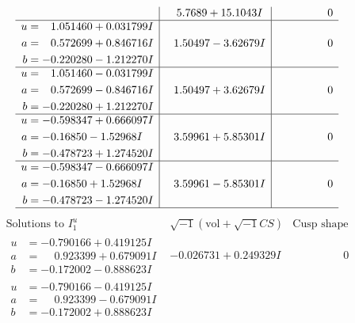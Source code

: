 \documentclass[1p]{elsarticle_modified}
\theoremstyle{definition}
\newcommand{\I}{\sqrt{-1}}
\begin{document}
$$\begin{array}{c|c|c}
 & \phantom{-}5.7689 + 15.1043 I & \phantom{-0.000000 } 0 \\ \hline\begin{aligned}
u &= \phantom{-}1.051460 + 0.031799 I \\
a &= \phantom{-}0.572699 + 0.846716 I \\
b &= -0.220280 - 1.212270 I\end{aligned}
 & \phantom{-}1.50497 - 3.62679 I & \phantom{-0.000000 } 0 \\ \hline\begin{aligned}
u &= \phantom{-}1.051460 - 0.031799 I \\
a &= \phantom{-}0.572699 - 0.846716 I \\
b &= -0.220280 + 1.212270 I\end{aligned}
 & \phantom{-}1.50497 + 3.62679 I & \phantom{-0.000000 } 0 \\ \hline\begin{aligned}
u &= -0.598347 + 0.666097 I \\
a &= -0.16850 - 1.52968 I \\
b &= -0.478723 + 1.274520 I\end{aligned}
 & \phantom{-}3.59961 + 5.85301 I & \phantom{-0.000000 } 0 \\ \hline\begin{aligned}
u &= -0.598347 - 0.666097 I \\
a &= -0.16850 + 1.52968 I \\
b &= -0.478723 - 1.274520 I\end{aligned}
 & \phantom{-}3.59961 - 5.85301 I & \phantom{-0.000000 } 0\\
 \hline 
 \end{array}$$\newpage$$\begin{array}{c|c|c}  
\text{Solutions to }I^u_{1}& \I (\text{vol} + \sqrt{-1}CS) & \text{Cusp shape}\\
 \hline 
\begin{aligned}
u &= -0.790166 + 0.419125 I \\
a &= \phantom{-}0.923399 + 0.679091 I \\
b &= -0.172002 - 0.888623 I\end{aligned}
 & -0.026731 + 0.249329 I & \phantom{-0.000000 } 0 \\ \hline\begin{aligned}
u &= -0.790166 - 0.419125 I \\
a &= \phantom{-}0.923399 - 0.679091 I \\
b &= -0.172002 + 0.888623 I\end{aligned}

\end{array}$$
\end{document}
